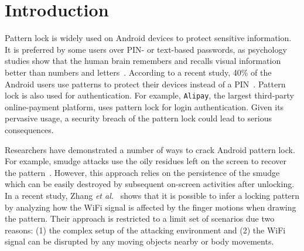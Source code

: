 \section{Introduction\label{sec:intro}}


Pattern lock is widely used on Android devices to protect sensitive information. It is preferred by some users over PIN- or text-based
passwords, as psychology studies show that the human brain remembers and
recalls visual information better than numbers and
letters~\cite{DeAngeli:2005:PRW:1090412.1090419}.
According to a recent study, 40\% of the Android users
use patterns to protect their devices instead of a PIN~\cite{androidstudy}.
Pattern lock is also used for authentication. For example, \texttt{Alipay}, the largest
third-party online-payment platform, uses pattern lock for login authentication.
Given its pervasive usage, a security breach of the pattern lock could lead to serious consequences.


Researchers have demonstrated a number of ways to crack Android pattern lock.
For example, smudge attacks use the oily residues  left on the screen to recover
the pattern~\cite{aviv2010smudge}. However, this approach relies on the persistence of
the smudge which can be easily destroyed by subsequent on-screen activities after unlocking. In a recent study, Zhang
\emph{et al.}~\cite{zhang2016privacy} shows that it is possible to infer a locking pattern by analyzing how the WiFi signal is affected by the finger motions when drawing the pattern. Their approach is restricted to
a limit set of scenarios due  two reasons: (1) the complex setup of the attacking environment and (2) the WiFi signal can be disrupted by any moving
objects nearby or body movements.


